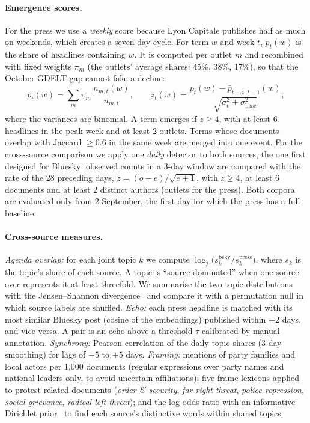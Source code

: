 \documentclass[pdflatex,sn-mathphys-num]{sn-jnl}
\begin{document}
\paragraph{Emergence scores.} For the press we use a \emph{weekly} score because Lyon Capitale publishes half as much on weekends, which creates a seven-day cycle. For term $w$ and week $t$, $p_t(w)$ is the share of headlines containing $w$. It is computed per outlet $m$ and recombined with fixed weights $\pi_m$ (the outlets' average shares: 45\%, 38\%, 17\%), so that the October GDELT gap cannot fake a decline:
\begin{equation}
p_t(w)=\sum_m \pi_m\,\frac{n_{m,t}(w)}{n_{m,t}},\qquad
z_t(w)=\frac{p_t(w)-\bar p_{t-4..t-1}(w)}{\sqrt{\sigma^2_t+\sigma^2_{\text{base}}}},
\end{equation}
where the variances are binomial. A term emerges if $z\ge 4$, with at least 6 headlines in the peak week and at least 2 outlets. Terms whose documents overlap with Jaccard $\ge 0.6$ in the same week are merged into one event. For the cross-source comparison we apply one \emph{daily} detector to both sources, the one first designed for Bluesky: observed counts in a 3-day window are compared with the rate of the 28 preceding days, $z=(o-e)/\sqrt{e+1}$, with $z\ge 4$, at least 6 documents and at least 2 distinct authors (outlets for the press). Both corpora are evaluated only from 2 September, the first day for which the press has a full baseline.

\paragraph{Cross-source measures.}
\emph{Agenda overlap:} for each joint topic $k$ we compute $\log_2\!\big(s^{\text{bsky}}_k / s^{\text{press}}_k\big)$, where $s_k$ is the topic's share of each source. A topic is ``source-dominated'' when one source over-represents it at least threefold. We summarise the two topic distributions with the Jensen--Shannon divergence~\cite{lin1991jsd} and compare it with a permutation null in which source labels are shuffled.
\emph{Echo:} each press headline is matched with its most similar Bluesky post (cosine of the embeddings) published within $\pm 2$ days, and vice versa. A pair is an echo above a threshold $\tau$ calibrated by manual annotation.
\emph{Synchrony:} Pearson correlation of the daily topic shares (3-day smoothing) for lags of $-5$ to $+5$ days.
\emph{Framing:} mentions of party families and local actors per 1,000 documents (regular expressions over party names and national leaders only, to avoid uncertain affiliations); five frame lexicons applied to protest-related documents (\emph{order \& security}, \emph{far-right threat}, \emph{police repression}, \emph{social grievance}, \emph{radical-left threat}); and the log-odds ratio with an informative Dirichlet prior~\cite{monroe2008fightin} to find each source's distinctive words within shared topics.
\end{document}
